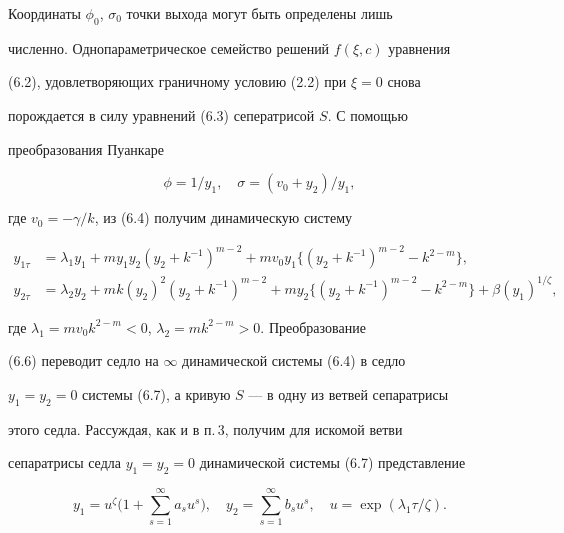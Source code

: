 Координаты $\phi_0$, $\sigma_0$ точки выхода могут быть определены лишь 


численно. Однопараметрическое семейство решений $f(\xi,c)$ уравнения 


(6.2), удовлетворяющих граничному условию (2.2) при $\xi=0$ снова 


порождается в силу уравнений (6.3) сеператрисой $S$. С помощью 


преобразования Пуанкаре 


\begin{equation} 


\phi=1/y_1,\quad \sigma=(v_0+y_2)/y_1, 


\end{equation} 


где $v_0=-\gamma/k$, из (6.4) получим динамическую систему 


\begin{equation} 


\begin{split} 


y_{1\tau}&=\lambda_1y_1+m y_1y_2(y_2+k^{-1})^{m-2}+m v_0y_1 


\{(y_2+k^{-1})^{m-2}-k^{2-m}\},\\ 


y_{2\tau}&=\lambda_2y_2+m k(y_2)^2(y_2+k^{-1})^{m-2}+m y_2 


\{(y_2+k^{-1})^{m-2}-k^{2-m}\}+\beta(y_1)^{1/\zeta}, 


\end{split} 


\end{equation} 


где $\lambda_1=m v_0k^{2-m}<0$, $\lambda_2=m k^{2-m}>0$. Преобразование 


(6.6) переводит седло на $\infty$ динамической системы (6.4) в седло 


$y_1=y_2=0$ системы (6.7), а кривую $S$ --- в одну из ветвей сепаратрисы 


этого седла. Рассуждая, как и в п.\,3, получим для искомой ветви 


сепаратрисы седла $y_1=y_2=0$ динамической системы (6.7) представление 


\begin{equation} 


y_1=u^\zeta\bigg(1+\sum^\infty_{s=1}a_s u^s\bigg),\quad 


y_2=\sum^\infty_{s=1}b_s u^s,\quad u=\exp(\lambda_1\tau/\zeta). 


\end{equation} 


